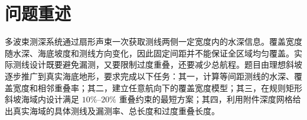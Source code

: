\section{问题重述}
多波束测深系统通过扇形声束一次获取测线两侧一定宽度内的水深信息。覆盖宽度随水深、海底坡度和测线方向变化，因此固定间距并不能保证全区域均匀覆盖。实际测线设计既要避免漏测，又要限制过度重叠，还要减少总航程。题目由理想斜坡逐步推广到真实海底地形，要求完成以下任务：其一，计算等间距测线的水深、覆盖宽度和相邻重叠率；其二，建立任意航向下的覆盖宽度模型；其三，在规则矩形斜坡海域内设计满足 $10\%$--$20\%$ 重叠约束的最短方案；其四，利用附件深度网格给出真实海域的具体测线及漏测率、总长度和过度重叠长度。
